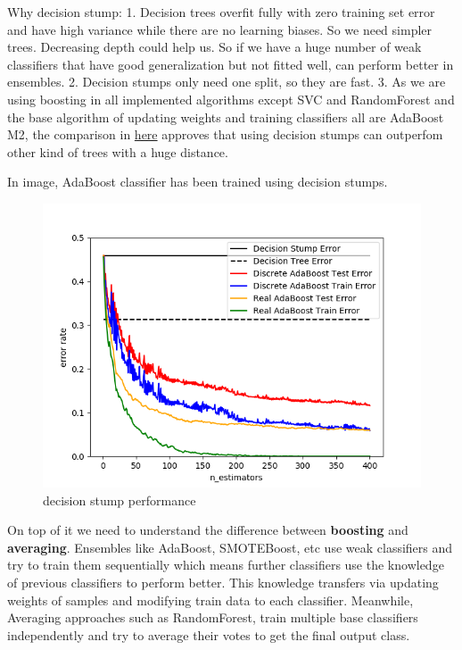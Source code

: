 \documentclass[11pt]{article}
\makeatletter
\def\maxwidth{\ifdim\Gin@nat@width>\linewidth\linewidth
    \else\Gin@nat@width\fi}
\let\Oldincludegraphics\includegraphics
\renewcommand{\includegraphics}[1]{\Oldincludegraphics[width=.8\maxwidth]{#1}}
\makeatother
\begin{document}
Why decision stump: 1. Decision trees overfit fully with zero training
set error and have high variance while there are no learning biases. So
we need simpler trees. Decreasing depth could help us. So if we have a
huge number of weak classifiers that have good generalization but not
fitted well, can perform better in ensembles. 2. Decision stumps only
need one split, so they are fast. 3. As we are using boosting in all
implemented algorithms except SVC and RandomForest and the base
algorithm of updating weights and training classifiers all are AdaBoost
M2, the comparison in
\href{https://scikit-learn.org/stable/auto_examples/ensemble/plot_adaboost_hastie_10_2.html\#sphx-glr-auto-examples-ensemble-plot-adaboost-hastie-10-2-py}{here}
approves that using decision stumps can outperfom other kind of trees
with a huge distance.

In image, AdaBoost classifier has been trained using decision stumps.

\begin{figure}
\centering
\includegraphics{wiki/1.png}
\caption{decision stump performance}
\end{figure}

On top of it we need to understand the difference between
\textbf{boosting} and \textbf{averaging}. Ensembles like AdaBoost,
SMOTEBoost, etc use weak classifiers and try to train them sequentially
which means further classifiers use the knowledge of previous
classifiers to perform better. This knowledge transfers via updating
weights of samples and modifying train data to each classifier.
Meanwhile, Averaging approaches such as RandomForest, train multiple
base classifiers independently and try to average their votes to get the
final output class.
\end{document}
